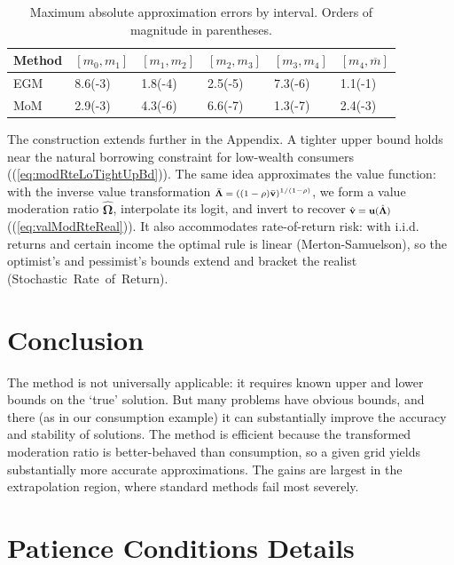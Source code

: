 \documentclass[preprint,authoryear]{elsarticle}
\newcommand{\CRRA}{\rho}
\newcommand{\uFunc}{\mathbf{u}}
\newcommand{\vFunc}{\mathbf{v}}
\newcommand{\vFuncOpt}{\bar{\vFunc}}
\newcommand{\vInv}{{\scriptsize \boldsymbol{\Lambda}}}
\newcommand{\vInvOpt}{\bar{\vInv}}
\newcommand{\valModRte}{\boldsymbol{\Omega}}
\newcommand{\valModRteReal}{\hat{\valModRte}}
\newcommand{\vFuncReal}{\hat{\vFunc}}
\newcommand{\vInvReal}{\hat{\vInv}}
\begin{document}
\begin{table}
\centering
\caption[]{Maximum absolute approximation errors by interval. Orders of magnitude in parentheses.}
\label{tbl:approx-errors}
\begin{tabular}{p{}p{}p{}p{}p{}p{}}
\toprule
Method & $[m_0,m_1]$ & $[m_1,m_2]$ & $[m_2,m_3]$ & $[m_3,m_4]$ & $[m_4,\overline{m}]$ \\
\hline
EGM & 8.6(-3) & 1.8(-4) & 2.5(-5) & 7.3(-6) & 1.1(-1) \\
MoM & 2.9(-3) & 4.3(-6) & 6.6(-7) & 1.3(-7) & 2.4(-3) \\
\bottomrule
\end{tabular}
\end{table}

The construction extends further in the Appendix. A tighter upper bound holds near the natural borrowing constraint for low-wealth consumers ((\ref{eq:modRteLoTightUpBd})). The same idea approximates the value function: with the inverse value transformation $\vInvOpt = \left((1 -\CRRA)\vFuncOpt\right)^{1/(1 -\CRRA)}$, we form a value moderation ratio $\valModRteReal$, interpolate its logit, and invert to recover $\vFuncReal = \uFunc(\vInvReal)$ ((\ref{eq:valModRteReal})). It also accommodates rate-of-return risk: with i.i.d. returns and certain income the optimal rule is linear (Merton-Samuelson), so the optimist's and pessimist's bounds extend and bracket the realist (Stochastic~Rate~of~Return).

\section{Conclusion}

The method is not universally applicable: it requires known upper and lower bounds on the `true' solution. But many problems have obvious bounds, and there (as in our consumption example) it can substantially improve the accuracy and stability of solutions. The method is efficient because the transformed moderation ratio is better-behaved than consumption, so a given grid yields substantially more accurate approximations. The gains are largest in the extrapolation region, where standard methods fail most severely.



\appendix
\section{Patience Conditions Details}
\end{document}
